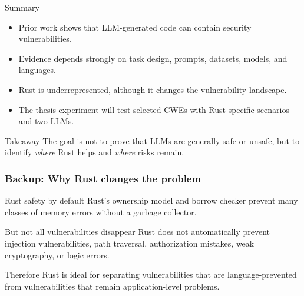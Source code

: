 
\begin{frame}{Summary}
    
    \begin{itemize}
        \item Prior work shows that LLM-generated code can contain security vulnerabilities.
        \item Evidence depends strongly on task design, prompts, datasets, models, and languages.
        \item Rust is underrepresented, although it changes the vulnerability landscape.
        \item The thesis experiment will test selected CWEs with Rust-specific scenarios and two LLMs.
    \end{itemize}
    
    \bigskip
    
    \begin{alertblock}{Takeaway}
    The goal is not to prove that LLMs are generally safe or unsafe, but to identify \textit{where} Rust helps and \textit{where} risks remain.
    \end{alertblock}

\end{frame}


\begin{frame}
\frametitle{Backup: Why Rust changes the problem}

\begin{block}{Rust safety by default}
Rust's ownership model and borrow checker prevent many classes of memory errors without a garbage collector.
\end{block}

\begin{alertblock}{But not all vulnerabilities disappear}
Rust does not automatically prevent injection vulnerabilities, path traversal, authorization mistakes, weak cryptography, or logic errors.
\end{alertblock}

\begin{exampleblock}{Therefore}
Rust is ideal for separating vulnerabilities that are language-prevented from vulnerabilities that remain application-level problems.
\end{exampleblock}

\end{frame}

